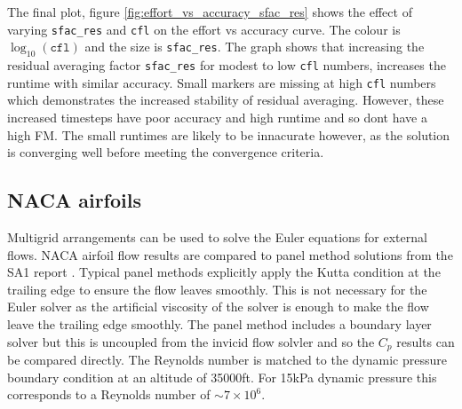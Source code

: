 \documentclass{article}
\begin{document}
The final plot, figure \ref{fig:effort_vs_accuracy_sfac_res} shows the effect of varying \texttt{sfac\_res} and \texttt{cfl} on the effort vs accuracy curve.
The colour is $\log_{10}(\texttt{cfl})$ and the size is \texttt{sfac\_res}.
The graph shows that increasing the residual averaging factor \texttt{sfac\_res} for modest to low \texttt{cfl} numbers, increases the runtime with similar accuracy.
Small markers are missing at high \texttt{cfl} numbers which demonstrates the increased stability of residual averaging.
However, these increased timesteps have poor accuracy and high runtime and so dont have a high FM.
The small runtimes are likely to be innacurate however, as the solution is converging well before meeting the convergence criteria.

\subsection{NACA airfoils}

Multigrid arrangements can be used to solve the Euler equations for external flows.
NACA airfoil flow results are compared to panel method solutions from the SA1 report \cite{SA1}.
Typical panel methods explicitly apply the Kutta condition at the trailing edge to ensure the flow leaves smoothly.
This is not necessary for the Euler solver as the artificial viscosity of the solver is enough to make the flow leave the trailing edge smoothly.
The panel method includes a boundary layer solver but this is uncoupled from the invicid flow solvler and so the $C_p$ results can be compared directly.
The Reynolds number is matched to the dynamic pressure boundary condition at an altitude of 35000ft.
For 15kPa dynamic pressure this corresponds to a Reynolds number of $\sim7\times10^6$.
\end{document}
